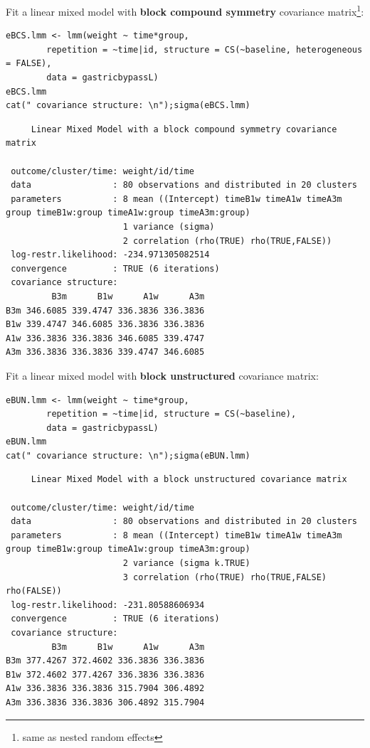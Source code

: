 \documentclass[12pt]{article}
\begin{document}
\clearpage

\noindent Fit a linear mixed model with \textbf{block compound symmetry}
covariance matrix\footnote{same as nested random effects}:
\lstset{language=r,label= ,caption= ,captionpos=b,numbers=none}
\begin{lstlisting}
eBCS.lmm <- lmm(weight ~ time*group,
		repetition = ~time|id, structure = CS(~baseline, heterogeneous = FALSE),
		data = gastricbypassL)
eBCS.lmm
cat(" covariance structure: \n");sigma(eBCS.lmm)
\end{lstlisting}

\begin{verbatim}
     Linear Mixed Model with a block compound symmetry covariance matrix 

 outcome/cluster/time: weight/id/time 
 data                : 80 observations and distributed in 20 clusters 
 parameters          : 8 mean ((Intercept) timeB1w timeA1w timeA3m group timeB1w:group timeA1w:group timeA3m:group) 
                       1 variance (sigma) 
                       2 correlation (rho(TRUE) rho(TRUE,FALSE)) 
 log-restr.likelihood: -234.971305082514 
 convergence         : TRUE (6 iterations)
 covariance structure: 
         B3m      B1w      A1w      A3m
B3m 346.6085 339.4747 336.3836 336.3836
B1w 339.4747 346.6085 336.3836 336.3836
A1w 336.3836 336.3836 346.6085 339.4747
A3m 336.3836 336.3836 339.4747 346.6085
\end{verbatim}

\noindent Fit a linear mixed model with \textbf{block unstructured} covariance matrix:
\lstset{language=r,label= ,caption= ,captionpos=b,numbers=none}
\begin{lstlisting}
eBUN.lmm <- lmm(weight ~ time*group,
		repetition = ~time|id, structure = CS(~baseline),
		data = gastricbypassL)
eBUN.lmm
cat(" covariance structure: \n");sigma(eBUN.lmm)
\end{lstlisting}

\begin{verbatim}
     Linear Mixed Model with a block unstructured covariance matrix 

 outcome/cluster/time: weight/id/time 
 data                : 80 observations and distributed in 20 clusters 
 parameters          : 8 mean ((Intercept) timeB1w timeA1w timeA3m group timeB1w:group timeA1w:group timeA3m:group) 
                       2 variance (sigma k.TRUE) 
                       3 correlation (rho(TRUE) rho(TRUE,FALSE) rho(FALSE)) 
 log-restr.likelihood: -231.80588606934 
 convergence         : TRUE (6 iterations)
 covariance structure: 
         B3m      B1w      A1w      A3m
B3m 377.4267 372.4602 336.3836 336.3836
B1w 372.4602 377.4267 336.3836 336.3836
A1w 336.3836 336.3836 315.7904 306.4892
A3m 336.3836 336.3836 306.4892 315.7904
\end{verbatim}
\end{document}

